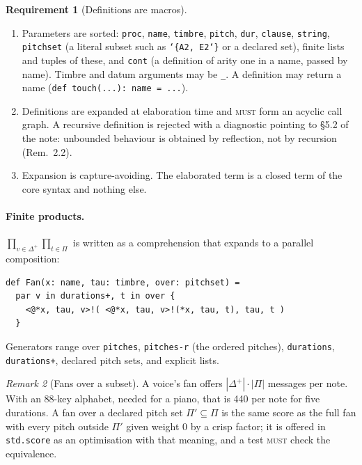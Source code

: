 \documentclass[11pt,a4paper]{article}
\theoremstyle{definition}
\newtheorem{requirement}{Requirement}[section]
\theoremstyle{remark}
\newtheorem{remark}[requirement]{Remark}
\newcommand{\Pit}{\Pi}
\newcommand{\Dur}{\Delta}
\newcommand{\MUST}{\textsc{must}}
\begin{document}
\begin{requirement}[Definitions are macros]\label{req:macros}
\begin{enumerate}[label=(\roman*),itemsep=1pt]
\item Parameters are sorted: \texttt{proc}, \texttt{name}, \texttt{timbre},
  \texttt{pitch}, \texttt{dur}, \texttt{clause}, \texttt{string},
  \texttt{pitchset} (a literal subset such as \texttt{\char`\{A2, E2\char`\}} or a declared
  set), finite lists and tuples of these, and \texttt{cont} (a definition of
  arity one in a name, passed by name). Timbre
  and datum arguments may be \texttt{\_}. A definition may return a name
  (\texttt{def touch(...): name = ...}).
\item Definitions are expanded at elaboration time and \MUST{} form an acyclic
  call graph. A recursive definition is rejected with a diagnostic pointing to
  \S5.2 of the note: unbounded behaviour is obtained by reflection, not by
  recursion (Rem.~2.2).
\item Expansion is capture-avoiding. The elaborated term is a closed term of
  the core syntax and nothing else.
\end{enumerate}
\end{requirement}

\paragraph{Finite products.} $\prod_{v\in\Dur^+}\prod_{t\in\Pit}$ is written as
a comprehension that expands to a parallel composition:
\begin{lstlisting}[language=score]
def Fan(x: name, tau: timbre, over: pitchset) =
  par v in durations+, t in over {
    <@*x, tau, v>!( <@*x, tau, v>!(*x, tau, t), tau, t )
  }
\end{lstlisting}
Generators range over \texttt{pitches}, \texttt{pitches-r} (the ordered
pitches), \texttt{durations}, \texttt{durations+}, declared pitch sets, and
explicit lists.

\begin{remark}[Fans over a subset]
A voice's fan offers $|\Dur^+|\cdot|\Pit|$ messages per note. With an 88-key
alphabet, needed for a piano, that is 440 per note for five durations. A fan
over a declared pitch set $\Pit' \subseteq \Pit$ is the same score as the full
fan with every pitch outside $\Pit'$ given weight $0$ by a crisp factor; it is
offered in \texttt{std.score} as an optimisation with that meaning, and a test
\MUST{} check the equivalence.
\end{remark}
\end{document}
